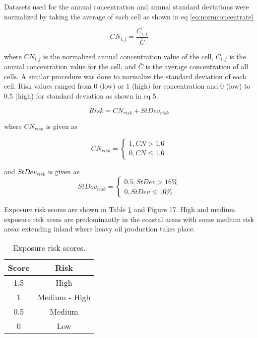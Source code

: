Datasets used for the annual concentration and annual standard deviations were normalized by taking the average of each cell as shown in eq \ref{eq:normconcentrate}

\begin{equation}
\label{eq:normconcentrate}
CN_{i,j}=\frac{C_{i,j}}{\bar{C}}
\end{equation}

\noindent
where $CN_{i,j}$ is the normalized annual concentration value of the cell, $C_{i,j}$ is the annual concentration value for the cell, and $\bar{C}$ is the average concentration of all cells.  A similar procedure was done to normalize the standard deviation of each cell.  Risk values ranged from 0 (low) or 1 (high) for concentration and 0 (low) to 0.5 (high) for standard deviation as shown in eq 5. 

\begin{equation}
\label{eq:riskscore}
Risk = CN_{risk} + StDev_{risk}
\end{equation}

\noindent
where $CN_{risk}$ is given as

\begin{equation}
\label{eq:riskCN1}
CN_{risk} = \left\{\begin{matrix}
1, CN > 1.6\\ 
0, CN \leq 1.6
\end{matrix}\right.
\end{equation}

\noindent
and $StDev_{risk}$ is given as
\begin{equation}
\label{eq:riskCN2}
StDev_{risk} = \left\{\begin{matrix}
0.5, StDev > 16\%\\ 
0, StDev \leq 16\%
\end{matrix}\right.
\end{equation}

Exposure risk scores are shown in Table \ref{tb:expriskscores} and Figure 17.  High and medium exposure risk areas are predominantly in the coastal areas with some medium risk areas extending inland where heavy oil production takes place.

\begin{table}[H]
\centering
\caption{Exposure risk scores.}
\label{tb:expriskscores}
\begin{tabular}{@{}cc@{}}
\toprule
\textbf{Score} & \textbf{Risk} \\ \midrule
1.5            & High          \\
1              & Medium - High \\
0.5            & Medium        \\
0              & Low           \\ \bottomrule
\end{tabular}
\end{table}

